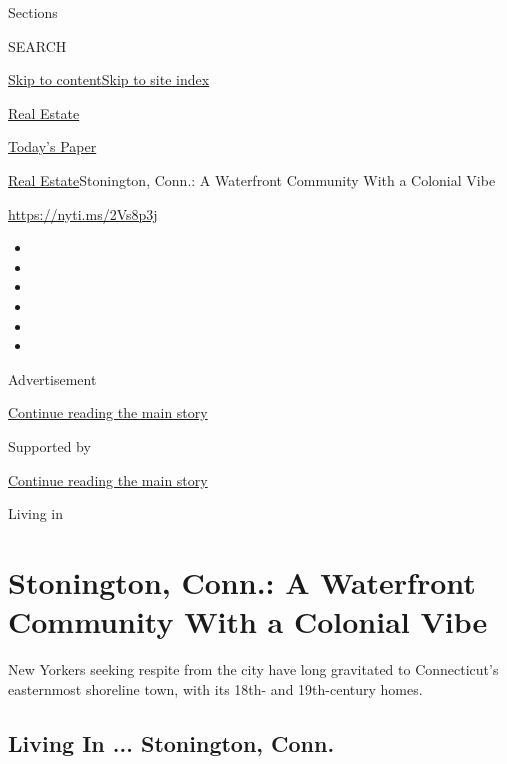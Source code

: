 Sections

SEARCH

\protect\hyperlink{site-content}{Skip to
content}\protect\hyperlink{site-index}{Skip to site index}

\href{https://www.nytimes3xbfgragh.onion/section/realestate}{Real
Estate}

\href{https://myaccount.nytimes3xbfgragh.onion/auth/login?response_type=cookie\&client_id=vi}{}

\href{https://www.nytimes3xbfgragh.onion/section/todayspaper}{Today's
Paper}

\href{/section/realestate}{Real Estate}\textbar{}Stonington, Conn.: A
Waterfront Community With a Colonial Vibe

\url{https://nyti.ms/2Vs8p3j}

\begin{itemize}
\item
\item
\item
\item
\item
\item
\end{itemize}

Advertisement

\protect\hyperlink{after-top}{Continue reading the main story}

Supported by

\protect\hyperlink{after-sponsor}{Continue reading the main story}

Living in

\hypertarget{stonington-conn-a-waterfront-community-with-a-colonial-vibe}{%
\section{Stonington, Conn.: A Waterfront Community With a Colonial
Vibe}\label{stonington-conn-a-waterfront-community-with-a-colonial-vibe}}

New Yorkers seeking respite from the city have long gravitated to
Connecticut's easternmost shoreline town, with its 18th- and
19th-century homes.

\href{https://www.nytimes3xbfgragh.onion/slideshow/2020/04/22/realestate/living-in-stonington-conn.html}{}

\hypertarget{living-in--stonington-conn}{%
\subsection{Living In ... Stonington,
Conn.}\label{living-in--stonington-conn}}


